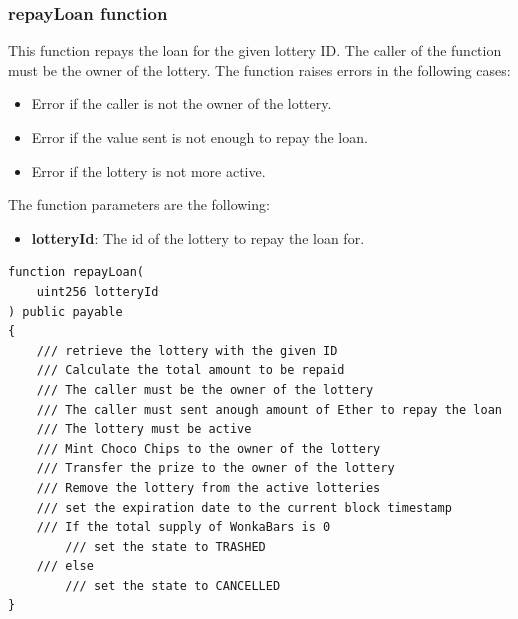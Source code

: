 \subsubsection{repayLoan function}
This function repays the loan for the given lottery ID. The caller of the function must be the owner of the lottery. The function raises errors in the following cases:
\begin{itemize}
    \item Error if the caller is not the owner of the lottery.
    \item Error if the value sent is not enough to repay the loan.
    \item Error if the lottery is not more active.
\end{itemize}
The function parameters are the following:
\begin{itemize}
    \item \textbf{lotteryId}: The id of the lottery to repay the loan for.
\end{itemize}
\begin{verbatim}
function repayLoan(
    uint256 lotteryId
) public payable 
{
    /// retrieve the lottery with the given ID
    /// Calculate the total amount to be repaid
    /// The caller must be the owner of the lottery
    /// The caller must sent anough amount of Ether to repay the loan
    /// The lottery must be active
    /// Mint Choco Chips to the owner of the lottery
    /// Transfer the prize to the owner of the lottery
    /// Remove the lottery from the active lotteries
    /// set the expiration date to the current block timestamp
    /// If the total supply of WonkaBars is 0
        /// set the state to TRASHED
    /// else
        /// set the state to CANCELLED
}
\end{verbatim}
